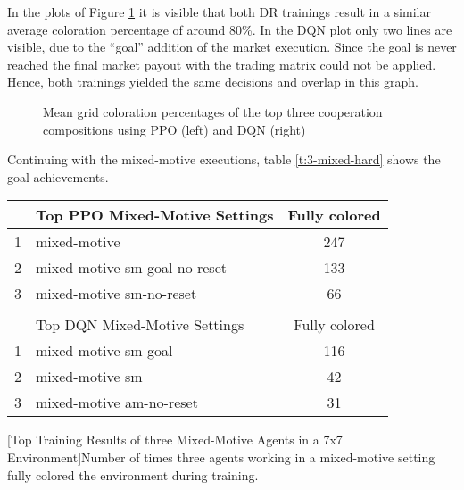 In the plots of Figure \ref{fig:multipic_plots_coop_hard} it is visible that both DR trainings result in a similar average coloration percentage of around 80\%. In the DQN plot only two lines are visible, due to the ``goal'' addition of the market execution. Since the goal is never reached the final market payout with the trading matrix could not be applied. Hence, both trainings yielded the same decisions and overlap in this graph. 

\begin{figure}[hpbt]
    \centering
    \hspace{0.01\textwidth}
    \caption[Mean Coloration Percentage of the Top Cooperation Modes in a 7x7 Environment]{Mean grid coloration percentages of the top three cooperation compositions using PPO (left) and DQN (right)}
    \label{fig:multipic_plots_coop_hard} %
\end{figure}

Continuing with the mixed-motive executions, table \ref{t:3-mixed-hard} shows the goal achievements.

\begin{center}
\begin{tabular}{clc}\hline
      & Top PPO Mixed-Motive Settings & Fully colored \\ \hline
    {\small 1} & mixed-motive & 247 \\
    {\small 2} & mixed-motive sm-goal-no-reset & 133 \\
    {\small 3} & mixed-motive sm-no-reset & 66 \\ \hline
      &   \\ \hline
      & Top DQN Mixed-Motive Settings & Fully colored \\ \hline
    {\small 1} & mixed-motive sm-goal & 116 \\
    {\small 2} & mixed-motive sm & 42 \\
    {\small 3} & mixed-motive am-no-reset & 31 \\ \hline
    \end{tabular}
    [Top Training Results of three Mixed-Motive Agents in a 7x7 Environment]{Number of times three agents working in a mixed-motive setting fully colored the environment during training.}\label{t:3-mixed-hard}
\end{center}

